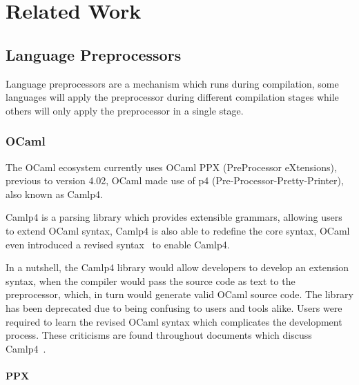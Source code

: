 
\chapter{Related Work}\label{cha:related-work}

\section{Language Preprocessors}\label{sec:lang-preprocessors}
Language preprocessors are a mechanism which runs during compilation,
some languages will apply the preprocessor during different compilation stages while others will only apply the preprocessor in a single stage.

\subsection{OCaml}\label{sec:lang-preprocessors:ocaml}

The OCaml ecosystem currently uses OCaml PPX (PreProcessor eXtensions),
previous to version 4.02, OCaml made use of p4 (Pre-Processor-Pretty-Printer), also known as Camlp4.

Camlp4 is a parsing library which provides extensible grammars,
allowing users to extend OCaml syntax,
Camlp4 is also able to redefine the core syntax,
OCaml even introduced a revised syntax~\autocite{Rauglaudre2003} to enable Camlp4.

In a nutshell, the Camlp4 library would allow developers to develop an extension syntax,
when the compiler would pass the source code as text to the preprocessor,
which, in turn would generate valid OCaml source code.
The library has been deprecated due to being confusing to users and tools alike.
Users were required to learn the revised OCaml syntax which complicates the development process.
These criticisms are found throughout documents which discuss Camlp4~\autocite{Whitequark2014}.

\subsubsection*{PPX}\label{sec:lang-preprocessors:ocaml:ppx}

